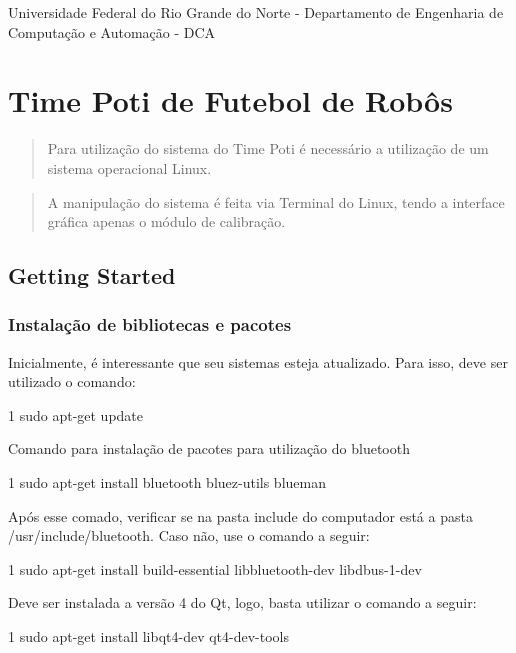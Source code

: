 Universidade Federal do Rio Grande do Norte -\/ Departamento de Engenharia de Computação e Automação -\/ D\+CA \section*{Time Poti de Futebol de Robôs }

\begin{quote}
Para utilização do sistema do Time Poti é necessário a utilização de um sistema operacional Linux. \end{quote}


\begin{quote}
A manipulação do sistema é feita via Terminal do Linux, tendo a interface gráfica apenas o módulo de calibração. \end{quote}


\subsection*{Getting Started }

\subsubsection*{Instalação de bibliotecas e pacotes}

Inicialmente, é interessante que seu sistemas esteja atualizado. Para isso, deve ser utilizado o comando\+:


\begin{DoxyCode}
1 sudo apt-get update
\end{DoxyCode}


Comando para instalação de pacotes para utilização do bluetooth 
\begin{DoxyCode}
1 sudo apt-get install bluetooth bluez-utils blueman
\end{DoxyCode}


Após esse comado, verificar se na pasta include do computador está a pasta {\ttfamily /usr/include/bluetooth}. Caso não, use o comando a seguir\+: 
\begin{DoxyCode}
1 sudo apt-get install build-essential libbluetooth-dev libdbus-1-dev
\end{DoxyCode}


Deve ser instalada a versão 4 do Qt, logo, basta utilizar o comando a seguir\+: 
\begin{DoxyCode}
1 sudo apt-get install libqt4-dev qt4-dev-tools
\end{DoxyCode}


